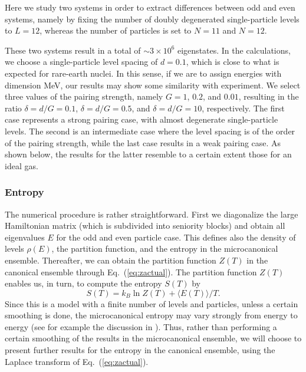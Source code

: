 \documentclass[preprint,rmp,aps,floatfix]{revtex4}
\begin{document}
Here we study two systems in order to extract differences 
between odd and even systems, namely by fixing the number of 
doubly degenerated single-particle levels to $L=12$, whereas the 
number of particles is set to $N=11$ and $N=12$.  

These two systems result in a total of 
$\sim 3 \times 10^6$ eigenstates. In the calculations, we 
choose a single-particle level spacing of $d=0.1$, which is close 
to what is expected for rare-earth nuclei. In this sense, if we are 
to assign energies with dimension MeV, our results may show some 
similarity with experiment. We select three values of the pairing strength, 
namely $G=1$, $0.2$, and $0.01$, resulting in the 
ratio $\delta=d/G=0.1$, $\delta=d/G=0.5$, and $\delta=d/G=10$, 
respectively. The first case represents a strong 
pairing case, with almost degenerate single-particle levels. The 
second is an intermediate case where the level spacing is of 
the order of the pairing strength, while the last case results in 
a weak pairing case. As shown below, the results for the latter 
resemble to a certain extent those for an ideal gas.

\subsubsection{Entropy}

The numerical procedure is rather straightforward. 
First we diagonalize the large Hamiltonian matrix (which is 
subdivided into seniority blocks) and obtain all 
eigenvalues $E$ for the odd and even particle case. This defines also 
the density of levels $\rho(E)$, the partition function, and 
the entropy in the microcanonical ensemble. Thereafter, we can 
obtain the partition function $Z(T)$ in the canonical ensemble through 
Eq.\ (\ref{eq:zactual}). The partition function 
$Z(T)$ enables us, in turn, to compute the entropy $S(T)$ by
\begin{equation}
    S(T)=k_B \ln Z(T)+\langle E(T)\rangle/T.
    \label{eq:canentropy}
\end{equation}
Since this is a model with a finite number of levels and 
particles, unless a certain smoothing is done, 
the microcanonical entropy may vary strongly from energy to energy
(see for example the discussion in \cite{entropy2000}).
Thus, rather than performing a 
certain smoothing of the results in the microcanonical ensemble, 
we will choose to present further results 
for the entropy in the canonical ensemble, using the 
Laplace transform of Eq.\ (\ref{eq:zactual}). 
\end{document}

